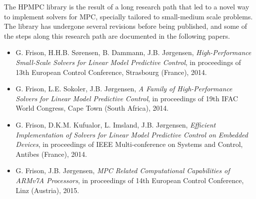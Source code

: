 \documentclass[a4paper]{report}
\begin{document}
The HPMPC library is the result of a long research path that led to a novel way to implement solvers for MPC, specially tailored to small-medium scale problems.
The library has undergone several revisions before being published, and some of the steps along this research path are documented in the following papers.
\begin{itemize}
\item G. Frison, H.H.B. S{\o}rensen, B. Dammann, J.B. J{\o}rgensen, \emph{ High-Performance Small-Scale Solvers for Linear Model Predictive Control}, in proceedings of 13th European Control Conference, Strasbourg (France), 2014.
\item G. Frison, L.E. Sokoler, J.B. J{\o}rgensen, \emph{A Family of High-Performance Solvers for Linear Model Predictive Control}, in proceedings of 19th IFAC World Congress, Cape Town (South Africa), 2014.
\item G. Frison, D.K.M. Kufualor, L. Imsland, J.B. J{\o}rgensen, \emph{Efficient Implementation of Solvers for Linear Model Predictive Control on Embedded Devices}, in proceedings of IEEE Multi-conference on Systems and Control, Antibes (France), 2014.
\item G. Frison, J.B. J{\o}rgensen, \emph{MPC Related Computational Capabilities of ARMv7A Processors}, in proceedings of 14th European Control Conference, Linz (Austria), 2015.
\end{itemize}
\end{document}
